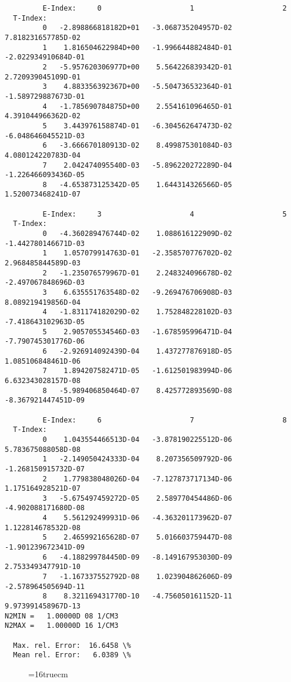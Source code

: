 \documentclass[12pt,dvipdfmx]{article}
\begin{document}
\begin{small}\begin{verbatim}
         E-Index:     0                     1                     2
  T-Index:
         0   -2.898866818182D+01   -3.068735204957D-02    7.818231657785D-02
         1    1.816504622984D+00   -1.996644882484D-01   -2.022934910684D-01
         2   -5.957620306977D+00    5.564226839342D-01    2.720939045109D-01
         3    4.883356392367D+00   -5.504736532364D-01   -1.589729887673D-01
         4   -1.785690784875D+00    2.554161096465D-01    4.391044966362D-02
         5    3.443976158874D-01   -6.304562647473D-02   -6.048646045521D-03
         6   -3.666670180913D-02    8.499875301084D-03    4.080124220783D-04
         7    2.042474095540D-03   -5.896220272289D-04   -1.226466093436D-05
         8   -4.653873125342D-05    1.644314326566D-05    1.520073468241D-07

         E-Index:     3                     4                     5
  T-Index:
         0   -4.360289476744D-02    1.088616122909D-02   -1.442780146671D-03
         1    1.057079914763D-01   -2.358570776702D-02    2.968485844589D-03
         2   -1.235076579967D-01    2.248324096678D-02   -2.497067848696D-03
         3    6.635551763548D-02   -9.269476706908D-03    8.089219419856D-04
         4   -1.831174182029D-02    1.752848228102D-03   -7.418643102963D-05
         5    2.905705534546D-03   -1.678595996471D-04   -7.790745301776D-06
         6   -2.926914092439D-04    1.437277876918D-05    1.085106848461D-06
         7    1.894207582471D-05   -1.612501983994D-06    6.632343028157D-08
         8   -5.989406850464D-07    8.425772893569D-08   -8.367921447451D-09

         E-Index:     6                     7                     8
  T-Index:
         0    1.043554466513D-04   -3.878190225512D-06    5.783675088058D-08
         1   -2.149050424333D-04    8.207356509792D-06   -1.268150915732D-07
         2    1.779838048026D-04   -7.127873717134D-06    1.175164928521D-07
         3   -5.675497459272D-05    2.589770454486D-06   -4.902088171680D-08
         4    5.561292499931D-06   -4.363201173962D-07    1.122814678532D-08
         5    2.465992165628D-07    5.016603759447D-08   -1.901239672341D-09
         6   -4.188299784450D-09   -8.149167953030D-09    2.753349347791D-10
         7   -1.167337552792D-08    1.023904862606D-09   -2.578964505694D-11
         8    8.321169431770D-10   -4.756050161152D-11    9.973991458967D-13
N2MIN =   1.00000D 08 1/CM3
N2MAX =   1.00000D 16 1/CM3

  Max. rel. Error:  16.6458 \%
  Mean rel. Error:   6.0389 \%

\end{verbatim}\end{small}
\begin{figure} \label{2.3.2B0}
\epsfxsize=16truecm
\end{figure}
\newpage
\end{document}
